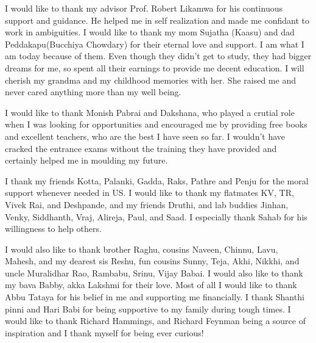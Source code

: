	I would like to thank my advisor Prof. Robert Likamwa for his continuous support and guidance. He helped me in self realization and made me confidant to work in ambiguities. I would like to thank my mom Sujatha (Kaasu) and dad Peddakapu(Bucchiya Chowdary) for their eternal love and support. I am what I am today because of them. Even though they didn't get to study, they had bigger dreams for me, so spent all their earnings to provide me decent education. I will cherish my grandma and my childhood memories with her. She raised me and never cared anything more than my well being. 
	
	I would like to thank Monish Pabrai and Dakshana, who played a crutial role when I was looking for opportunities and encouraged me by providing free books and excellent teachers, who are the best I have seen so far. I wouldn't have cracked the entrance exams without the training they have provided and certainly helped me in moulding my future. 
	
	I thank my friends Kotta, Palanki, Gadda, Raks, Pathre and Penju for  the moral support whenever needed in US. I would like to thank my flatmates KV, TR, Vivek Rai, and Deshpande, and my friends Druthi, and lab buddies Jinhan, Venky, Siddhanth, Vraj, Alireja, Paul, and Saad. I especially thank Sahab for his willingness to help others. 
	
	I would also like to thank brother Raghu,  cousins Naveen, Chinnu, Lavu, Mahesh, and my dearest sis Reshu, fun cousins Sunny, Teja, Akhi, Nikkhi, and uncle Muralidhar Rao, Rambabu, Srinu, Vijay Babai. I would also like to thank my bava Babby, akka Lakshmi for their love. Most of all I would like to thank Abbu Tataya for his belief in me and supporting me financially. I thank Shanthi pinni and Hari Babi for being supportive to my family during tough times. I would like to thank Richard Hammings, and Richard Feynman being a source of inspiration and I thank myself for being ever curious!
